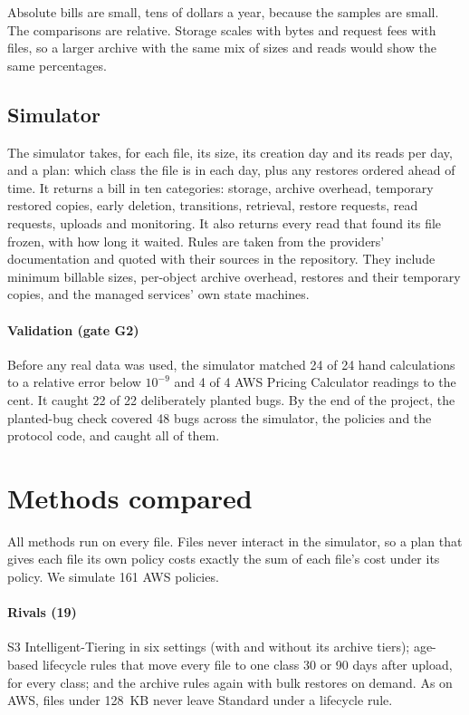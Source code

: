 \documentclass[11pt]{article}
\begin{document}
Absolute bills are small, tens of dollars a year, because the samples are small. The comparisons are relative. Storage scales with bytes and request fees with files, so a larger archive with the same mix of sizes and reads would show the same percentages.

\subsection{Simulator}

The simulator takes, for each file, its size, its creation day and its reads per day, and a plan: which class the file is in each day, plus any restores ordered ahead of time. It returns a bill in ten categories: storage, archive overhead, temporary restored copies, early deletion, transitions, retrieval, restore requests, read requests, uploads and monitoring. It also returns every read that found its file frozen, with how long it waited. Rules are taken from the providers' documentation and quoted with their sources in the repository. They include minimum billable sizes, per-object archive overhead, restores and their temporary copies, and the managed services' own state machines.

\paragraph{Validation (gate G2)} Before any real data was used, the simulator matched 24 of 24 hand calculations to a relative error below $10^{-9}$ and 4 of 4 AWS Pricing Calculator readings to the cent. It caught 22 of 22 deliberately planted bugs. By the end of the project, the planted-bug check covered 48 bugs across the simulator, the policies and the protocol code, and caught all of them.

\section{Methods compared}
\label{sec:methods}

All methods run on every file. Files never interact in the simulator, so a plan that gives each file its own policy costs exactly the sum of each file's cost under its policy. We simulate 161 AWS policies.

\paragraph{Rivals (19)} S3 Intelligent-Tiering in six settings (with and without its archive tiers); age-based lifecycle rules that move every file to one class 30 or 90 days after upload, for every class; and the archive rules again with bulk restores on demand. As on AWS, files under 128~KB never leave Standard under a lifecycle rule.
\end{document}
